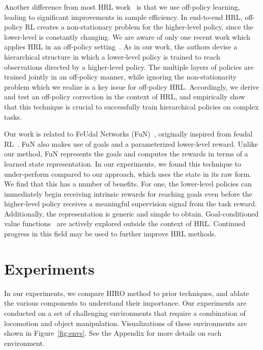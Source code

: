 \documentclass{article}
\begin{document}
Another difference from most HRL work~\cite{florensa2017stochastic,frans2017meta} is that we use off-policy learning, leading to significant improvements in sample efficiency. In end-to-end HRL, off-policy RL creates a non-stationary problem for the higher-level policy, since the lower-level is constantly changing. 
We are aware of only one recent work which applies HRL in an off-policy setting~\cite{levy2017hierarchical}.  As in our work, the authors devise a hierarchical structure in which a lower-level policy is trained to reach observations directed by a higher-level policy.  The multiple layers of policies are trained jointly in an off-policy manner, while ignoring the non-stationarity problem which we realize is a key issue for off-policy HRL.  
Accordingly, we derive and test an off-policy correction in the context of HRL, and empirically show that this technique is crucial to successfully train hierarchical policies on complex tasks.

Our work is related to FeUdal Networks (FuN)~\cite{vezhnevets2017feudal}, originally inspired from feudal RL~\cite{dayan1993feudal}. FuN also makes use of goals and a parameterized lower-level reward.  Unlike our method, FuN represents the goals and computes the rewards in terms of a learned state representation. In our experiments, we found this technique to under-perform compared to our approach, which uses the state in its raw form. We find that this has a number of benefits. For one, the lower-level policies can immediately begin receiving intrinsic rewards for reaching goals even before the higher-level policy receives a meaningful supervision signal from the task reward. Additionally, the representation is generic and simple to obtain. 
Goal-conditioned value functions~\cite{mahadevan2007proto,sutton2011horde,uvf,andrychowicz2017hindsight,pong2018temporal} are actively explored outside the context of HRL. Continued progress in this field may be used to further improve HRL methods. 

\section{Experiments}
\label{sec:experiments}

In our experiments, we compare HIRO method to prior techniques, and ablate the various components to understand their importance. Our experiments are conducted on a set of challenging environments that require a combination of locomotion and object manipulation. Visualizations of these environments are shown in Figure~\ref{fig:envs}.
See the Appendix for more details on each environment.
\end{document}
